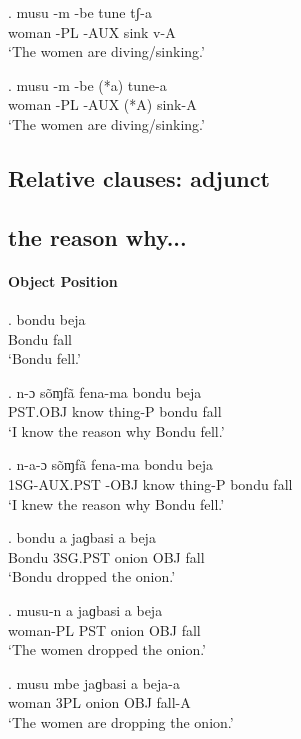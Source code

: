 \documentclass{assets/fieldnotes}
\begin{document}
{\exg.
musu    -m    -be    tune   tʃ-a  \\
woman   -PL   -AUX   sink   v-A \\%
`The women are diving/sinking.' \label{The women are diving - little v}


\exg.
musu    -m    -be    (*a)   tune-a \\
woman   -PL   -AUX   (*A)   sink-A \\%
`The women are diving/sinking.' \label{The women are diving}

\subsection*{Relative clauses: adjunct} 

\subsection*{the reason why...}

\paragraph*{Object Position}

\exg.
bondu   beja \\
Bondu   fall \\%
`Bondu fell.'


\exg.
n-ɔ      sõɱfã   fena-ma   bondu   beja \\
PST.OBJ  know    thing-P   bondu   fall \\%
`I know the reason why Bondu fell.'

\exg.
n-a-ɔ      sõɱfã   fena-ma   bondu   beja \\
1SG-AUX.PST -OBJ   know    thing-P   bondu   fall \\%
`I knew the reason why Bondu fell.'

\exg.
bondu   a     jaɡbasi   a     beja \\
Bondu   3SG.PST   onion     OBJ   fall \\%
`Bondu dropped the onion.'

\exg.
musu-n a    jaɡbasi   a     beja \\
woman-PL   PST   onion     OBJ   fall \\%
`The women dropped the onion.' \label{The women dropped the onion}

\exg.
musu    mbe    jaɡbasi   a     beja-a \\
woman   3PL   onion     OBJ   fall-A \\%
`The women are dropping the onion.' \label{The women are dropping the onion}

}
\end{document}
